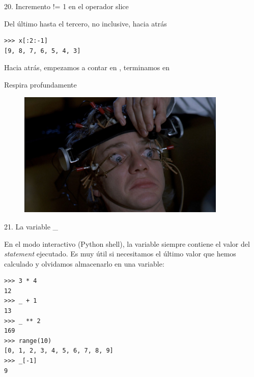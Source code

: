 \documentclass[14pt]{beamer}
\begin{document}
\begin{frame}[fragile]{20. Incremento != 1 en el operador slice}
  \begin{exampleblock}
    {Del último hasta el tercero, no inclusive, hacia atrás}
    \begin{lstlisting}
>>> x[:2:-1]
[9, 8, 7, 6, 5, 4, 3]
    \end{lstlisting}
  \end{exampleblock}

  \begin{alertblock}{}
    \small
    \centering
    Hacia atrás, empezamos a contar en , terminamos
    en 
  \end{alertblock}
\end{frame}

\begin{frame}{}
  \begin{block}{}
    \centering \Large Respira profundamente
  \end{block}

  \begin{figure}
    \centering
    \includegraphics[height=6cm]{pics/a-clockwork-orange-2.jpg}
  \end{figure}
\end{frame}

\begin{frame}[fragile]{21. La variable \_}
  \begin{alertblock}{}
    \small
    \centering
    En el modo interactivo (Python shell), la variable \structure{\_}
    siempre contiene el valor del  \emph{statement}
    ejecutado. Es muy útil si necesitamos  el último
    valor que hemos calculado y olvidamos almacenarlo en una variable:
  \end{alertblock}

  \footnotesize
  \begin{exampleblock}{}
    \begin{lstlisting}
>>> 3 * 4
12
>>> _ + 1
13
>>> _ ** 2
169
>>> range(10)
[0, 1, 2, 3, 4, 5, 6, 7, 8, 9]
>>> _[-1]
9
    \end{lstlisting}
  \end{exampleblock}
\end{frame}
\end{document}
